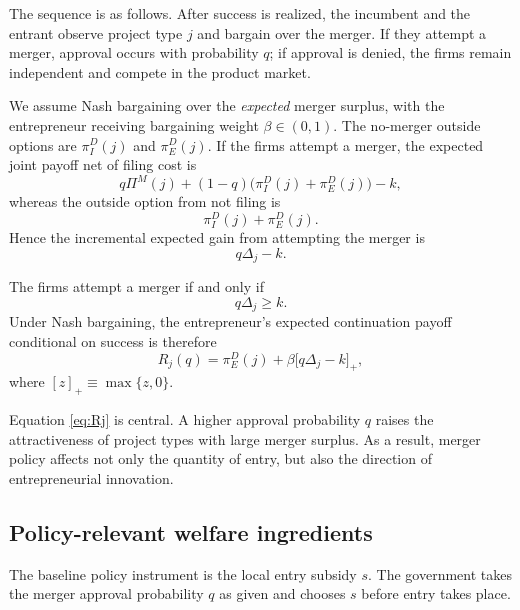 The sequence is as follows.
After success is realized, the incumbent and the entrant observe project type \(j\) and bargain over the merger.
If they attempt a merger, approval occurs with probability \(q\); if approval is denied, the firms remain independent and compete in the product market.

We assume Nash bargaining over the \emph{expected} merger surplus, with the entrepreneur receiving bargaining weight \(\beta \in (0,1)\).
The no-merger outside options are \(\pi_I^D(j)\) and \(\pi_E^D(j)\).
If the firms attempt a merger, the expected joint payoff net of filing cost is
\begin{equation}
    q\Pi^M(j) + (1-q)\bigl(\pi_I^D(j)+\pi_E^D(j)\bigr) - k,
\end{equation}
whereas the outside option from not filing is
\begin{equation}
    \pi_I^D(j)+\pi_E^D(j).
\end{equation}
Hence the incremental expected gain from attempting the merger is
\begin{equation}
    q\Delta_j - k.
\end{equation}

The firms attempt a merger if and only if
\begin{equation}\label{eq:attemptcondition}
    q\Delta_j \ge k.
\end{equation}
Under Nash bargaining, the entrepreneur's expected continuation payoff conditional on success is therefore
\begin{equation}\label{eq:Rj}
    R_j(q)
    =
    \pi_E^D(j)
    +
    \beta \bigl[q\Delta_j-k\bigr]_+,
\end{equation}
where \([z]_+ \equiv \max\{z,0\}\).

Equation \eqref{eq:Rj} is central.
A higher approval probability \(q\) raises the attractiveness of project types with large merger surplus.
As a result, merger policy affects not only the quantity of entry, but also the direction of entrepreneurial innovation.

\subsection{Policy-relevant welfare ingredients}

The baseline policy instrument is the local entry subsidy \(s\). The government takes the merger approval probability \(q\) as given and chooses \(s\) before entry takes place.

